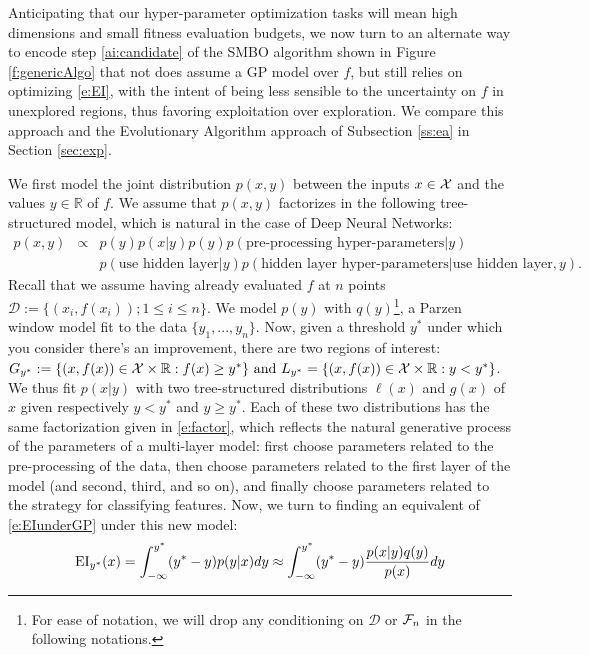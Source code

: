 \documentclass{article}
\newcommand{\vs}[1]{\vspace*{-#1mm}}
\begin{document}
Anticipating that our hyper-parameter optimization tasks will mean high
dimensions and small fitness evaluation budgets, we now turn to
an alternate way to encode step \ref{ai:candidate} of the
SMBO algorithm shown in Figure \ref{f:genericAlgo} that not does
assume a GP model over $f$, but
still relies on optimizing \ref{e:EI}, with the intent of being less
sensible to the uncertainty on $f$ in unexplored regions, thus
favoring exploitation over exploration. We compare this approach and
the Evolutionary Algorithm approach of Subsection \ref{ss:ea} in Section \ref{sec:exp}.

We first model the joint distribution $p(x,y)$ between the inputs
$x\in{\cal X}$ and the values $y\in\mathbb{R}$ of $f$. We assume that
$p(x,y)$ factorizes in the following tree-structured model, which is
natural in the case of Deep Neural Networks:
\begin{eqnarray}
    p(x,y) &\propto& p(y) p(x\vert y) p(y) p(\text{pre-processing hyper-parameters}|y) \nonumber\\
     & & p(\text{use hidden layer}|y) p(\text{hidden layer
      hyper-parameters}|\text{use hidden layer}, y) \label{e:factor}.
\end{eqnarray}
Recall that we assume having already evaluated $f$ at $n$ points $\mathcal{D}:=\{(x_i,f(x_i)) ; 1\leq
i\leq n\}$. We model $p(y)$ with $q(y)$\footnote{For ease of notation, we will drop any conditioning on
$\mathcal{D}$ or ${\cal F}_n$ in the following notations.}, a Parzen window
model fit to the data
$\{y_1,...,y_n\}$. Now, given a threshold $y^*$ under
which you consider there's an improvement, there
are two regions of interest: $G_{y^*} := \{(x,f(x))\in{\cal X}\times\mathbb{R}: f(x) \geq y^*\}\text{
  and  }L_{y^*} = \{(x,f(x))\in{\cal X}\times\mathbb{R}: y<y^*\}$.
 We thus fit $p(x\vert y)$ with two tree-structured
distributions $\ell(x)$ and $g(x)$ of $x$ given respectively $y<y^*$ and
$y\geq y^*$. Each of these two distributions has the same
factorization given in \eqref{e:factor}, which reflects the natural
generative process of the
parameters of a multi-layer model: first choose parameters related to
the pre-processing of the data,
then choose parameters related to the first layer of the model (and
second, third, and so on), and finally choose parameters related to
the strategy for classifying features. Now, we turn to finding an
equivalent of \eqref{e:EIunderGP} under this new model:
\begin{align}
\vs{.5}
    \mathrm{EI}_{y^*}(x)
    = \int_{-\infty}^{y^*} (y^* - y)p(y|x) dy
    \approx \int_{-\infty}^{y^*} (y^* - y) \frac{p(x|y)q(y)}{p(x)}
    dy
\vs{.5}
\end{align}
\end{document}
